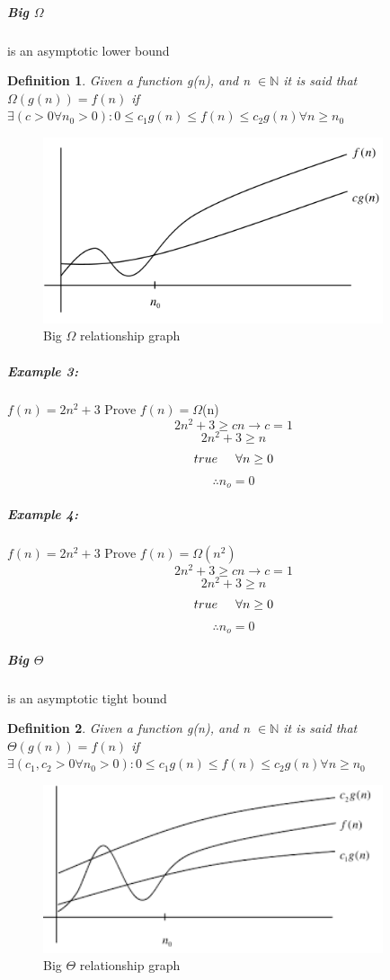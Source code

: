 \documentclass[12pt,letterpaper]{article}
\newtheorem{definition}{Definition}[section]
\begin{document}
\subparagraph*{Big $\Omega$}is an asymptotic lower bound
\begin{definition}
Given a function g(n), and n $\in \mathbb{N}$ it is said that\\ $ \Omega(g(n))= f(n)$ if $\exists (c>0 \forall n_0 > 0 ) : 0\leq c_1g(n) \leq f(n)\leq c_2g(n) \forall n \geq n_0$\\
\end{definition}
\begin{figure}[h]
\centering
\includegraphics[width=10cm]{bigomega}
\caption{Big $\Omega$ relationship graph}
\end{figure}

\subparagraph{Example 3:}
$f(n) = 2n^2+3$ Prove $f(n)= \Omega$(n)
\[2n^2+3\geq cn \to c=1\]
\[2n^2+3 \geq n \]
\[true \hspace{.5cm} \forall n \geq 0\]
\[\therefore n_o=0\]

\subparagraph{Example 4:}
$f(n) = 2n^2+3$ Prove $f(n)= \Omega(n^2)$
\[2n^2+3\geq cn \to c=1\]
\[2n^2+3 \geq n \]
\[true \hspace{.5cm} \forall n \geq 0\]
\[\therefore n_o=0\]

\subparagraph*{Big $\Theta$}is an asymptotic tight bound
\begin{definition}
Given a function g(n), and n $\in \mathbb{N}$ it is said that\\ $ \Theta(g(n))= f(n)$ if $\exists (c_1, c_2>0 \forall n_0 > 0 ) : 0\leq c_1g(n) \leq f(n)\leq c_2g(n) \forall n \geq n_0$\\
\end{definition}
\begin{figure}[h]
\centering
\includegraphics[width=10cm]{bigtheta}
\caption{Big $\Theta$ relationship graph}
\end{figure}
\end{document}
